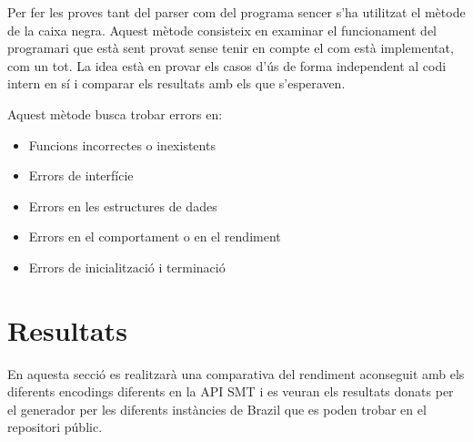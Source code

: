 \documentclass[11pt,a4paper,twoside]{report}
\begin{document}
   Per fer les proves tant del parser com del programa sencer s'ha utilitzat el mètode de la caixa negra\cite{wiki:blackbox}. Aquest mètode consisteix en examinar el funcionament del programari que està sent provat sense tenir en compte el com està implementat, com un tot. 
   La idea està en provar els casos d'ús de forma independent al codi intern en sí i comparar els resultats amb els que s'esperaven.
   
   Aquest mètode busca trobar errors en:
    \begin{itemize}
      \item Funcions incorrectes o inexistents
      \item Errors de interfície
      \item Errors en les estructures de dades
      \item Errors en el comportament o en el rendiment
      \item Errors de inicialització i terminació
    \end{itemize}


  
    
  \chapter{Resultats}
   
   

  En aquesta secció es realitzarà una comparativa del rendiment aconseguit amb els diferents encodings diferents en la API SMT 
  i es veuran els resultats donats per el generador per les diferents instàncies de Brazil que es poden trobar 
  en el repositori públic.
\end{document}
